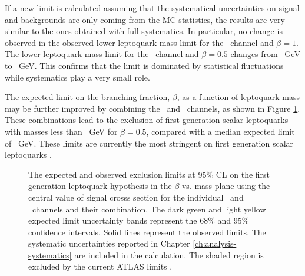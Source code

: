 If a new limit is calculated assuming that the systematical uncertainties
on signal and backgrounds are only coming from the MC statistics, the 
results are very similar to the ones obtained with full systematics.
In particular, no change is observed in the observed lower leptoquark mass limit for 
the \eejj~channel and $\beta = 1$. The lower leptoquark mass limit for the \enujj~channel 
and $\beta = 0.5$ changes from \ObservedLimitBetaHalfenujj~GeV to \ObservedLimitBetaHalfenujjOnlyMCStat~GeV.
This confirms that the limit is dominated by statistical 
fluctuations while systematics play a very small role.

The expected limit on the branching fraction, $\beta$, as a function 
of leptoquark mass may be further improved by combining the \eejj~and \enujj~channels,
as shown in Figure \ref{fig:limit-2D}.  These combinations lead to the exclusion of 
first generation scalar leptoquarks with masses less than \ObservedLimitBetaHalfenujjCombined~GeV
for $\beta = 0.5$, compared with a median expected limit of \ExpectedLimitBetaHalfenujjCombined~GeV.
These limits are currently the most stringent on first generation scalar leptoquarks \cite{pair-lq-CMS}.

\begin{figure}
  \centering
  \caption{The expected and observed exclusion limits at 95\% CL on the first generation leptoquark
    hypothesis in the $\beta$ vs. mass plane using the central value of signal crosss section for the
    individual \eejj~and \enujj~channels and their combination.  The dark green and light yellow expected
    limit uncertainty bands represent the 68\% and 95\% confidence intervals.  Solid lines represent
    the observed limits.  The systematic uncertainties reported in Chapter \ref{ch:analysis-systematics}
    are included in the calculation.  The shaded region is excluded by the current ATLAS limits \cite{pair-lq1-ATLAS}.}
  \label{fig:limit-2D}
\end{figure}
